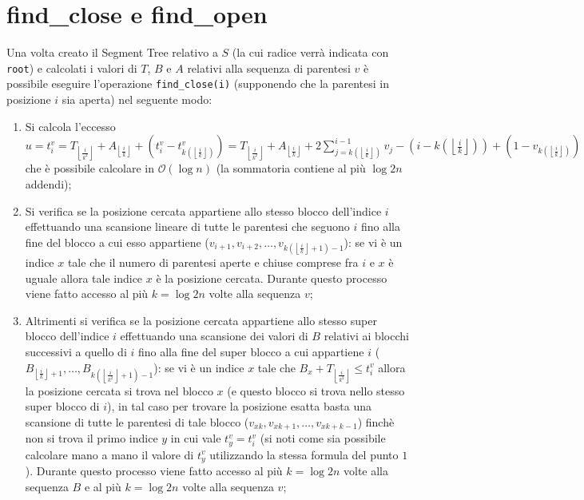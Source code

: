 \documentclass{article}
\begin{document}
\section{find\_close e find\_open}
Una volta creato il Segment Tree relativo a $S$ (la cui radice verrà indicata con \texttt{root}) e calcolati i valori di $T$, $B$ e $A$ relativi alla sequenza di parentesi $v$ è possibile eseguire l'operazione \texttt{find\_close(i)} (supponendo che la parentesi in posizione $i$ sia aperta) nel seguente modo:
    \begin{enumerate}
        \item Si calcola l'eccesso $u = t^v_i = T_{\left\lfloor{\frac{i}{k^2}}\right\rfloor}+A_{\left\lfloor{\frac{i}{k}}\right\rfloor} + (t^v_i-t^v_{k\left(\left\lfloor{\frac{i}{k}}\right\rfloor\right)})= T_{\left\lfloor{\frac{i}{k^2}}\right\rfloor}+A_{\left\lfloor{\frac{i}{k}}\right\rfloor}+2\sum_{j=k(\left\lfloor{\frac{i}{k}}\right\rfloor)}^{i-1} v_j-(i-k(\left\lfloor{\frac{i}{k}}\right\rfloor))+(1-v_{k(\left\lfloor{\frac{i}{k}}\right\rfloor)})$ che è possibile calcolare in $\mathcal{O}(\log{n})$ (la sommatoria contiene al più $\log{2n}$ addendi);
        \item Si verifica se la posizione cercata appartiene allo stesso blocco dell'indice $i$ effettuando una scansione lineare di tutte le parentesi che seguono $i$ fino alla fine del blocco a cui esso appartiene ($v_{i+1},v_{i+2},\dots,v_{k(\left\lfloor{\frac{i}{k}}\right\rfloor+1)-1}$): se vi è un indice $x$ tale che il numero di parentesi aperte e chiuse comprese fra $i$ e $x$ è uguale allora tale indice $x$ è la posizione cercata. Durante questo processo viene fatto accesso al più $k=\log 2n$ volte alla sequenza $v$;
        \item Altrimenti si verifica se la posizione cercata appartiene allo stesso super blocco dell'indice $i$ effettuando una scansione dei valori di $B$ relativi ai blocchi successivi a quello di $i$ fino alla fine del super blocco a cui appartiene $i$ ($B_{\left\lfloor{\frac{i}{k}}\right\rfloor+1},\dots,B_{k(\left\lfloor{\frac{i}{k^2}}\right\rfloor+1)-1}$): se vi è un indice $x$ tale che $B_x+T_{\left\lfloor{\frac{i}{k^2}}\right\rfloor} \leq t^v_i$ allora la posizione cercata si trova nel blocco $x$ (e questo blocco si trova nello stesso super blocco di $i$), in tal caso per trovare la posizione esatta basta una scansione di tutte le parentesi di tale blocco ($v_{xk},v_{xk+1},\dots,v_{xk+k-1}$) finchè non si trova il primo indice $y$ in cui vale $t^v_y=t^v_i$ (si noti come sia possibile calcolare mano a mano il valore di $t^v_y$ utilizzando la stessa formula del punto $1$). Durante questo processo viene fatto accesso al più $k=\log 2n$ volte alla sequenza $B$ e al più $k=\log 2n$ volte alla sequenza $v$;

\end{enumerate}
\end{document}
